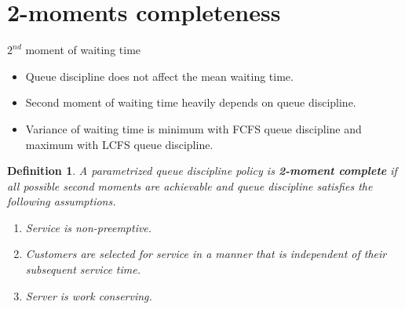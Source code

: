 \documentclass[compress, serif, onlymath, professionalfonts]{beamer}
\newtheorem{defn}{Definition}[section]
\begin{document}
\section{2-moments completeness}
\begin{frame}{$2^{nd}$ moment of waiting time}
\begin{itemize}
\item Queue discipline does not affect the mean waiting time.
\item Second moment of waiting time heavily depends on queue discipline. 
\item Variance of waiting time is minimum with FCFS queue discipline and maximum with LCFS queue discipline.
\end{itemize}
\begin{defn}
 A parametrized queue discipline policy is \textbf{2-moment complete} if all possible second moments are achievable and queue discipline satisfies the following assumptions.
\begin{enumerate}
\item Service is non-preemptive.
\item Customers are selected for service in a manner that is independent of their subsequent service time. 
\item Server is work conserving.
\end{enumerate}
\end{defn}
\end{frame}
\end{document}
